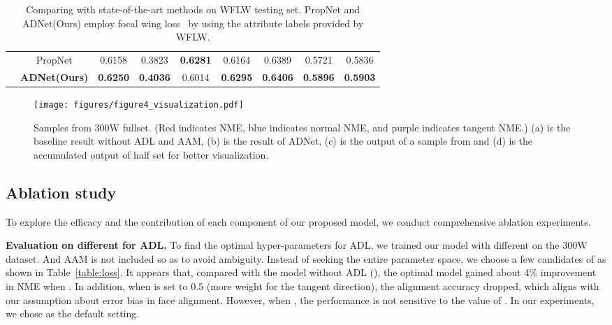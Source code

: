 \documentclass[10pt,twocolumn,letterpaper]{article}
\begin{document}
\begin{table*}
\begin{center}
\begin{tabular}{|l|c|c|c|c|c|c|c|c|}
\cline{2-9}
 & PropNet & 0.6158 & 0.3823 & \textbf{0.6281} & 0.6164 & 0.6389 & 0.5721 & 0.5836 \\
 & \textbf{ADNet(Ours)} & \textbf{0.6250} & \textbf{0.4036} & 0.6014 & \textbf{0.6295} & \textbf{0.6406} & \textbf{0.5896} & \textbf{0.5903} \\
\hline
\end{tabular}
\end{center}
\caption{Comparing with state-of-the-art methods on WFLW testing set. PropNet and ADNet(Ours) employ focal wing loss~\cite{huang2020propagationnet} by using the attribute labels provided by WFLW.}
\label{table:WFLW}
\end{table*}


\begin{figure}
\begin{center}
\texttt{[image: figures/figure4\_visualization.pdf]}
\end{center}
   \caption{Samples from 300W fullset. (\textcolor[rgb]{1, 0, 0}{Red} indicates NME, \textcolor[rgb]{0, 0.44, 0.75}{blue} indicates normal NME, and \textcolor[rgb]{0.44, 0.19, 0.63}{purple} indicates tangent NME.) (a) is the baseline result without ADL and AAM, (b) is the result of ADNet, (c) is the output of a sample from \textbf{} and (d) is the accumulated output of half \textbf{} set for better visualization.}
\label{figure:visualization}
\end{figure}

\subsection{Ablation study}
\label{subsection:ablation_study}
To explore the efficacy and the contribution of each component of our proposed model, we conduct comprehensive ablation experiments.

\vspace{5pt}
\noindent\textbf{Evaluation on different  for ADL.}
To find the optimal hyper-parameters for ADL, we trained our model with different  on the 300W dataset. And AAM is not included so as to avoid 
ambiguity.
Instead of seeking the entire parameter space, we choose a few candidates of  as shown in Table~\ref{table:loss}.
It appears that, compared with the model without ADL (), the optimal model gained about 4\% improvement in NME when .
In addition, when  is set to 0.5 (more weight for the tangent direction), the alignment accuracy dropped, which aligns with our assumption about error bias in face alignment.
However, when , the performance is not sensitive to the value of .
In our experiments, we chose  as the default setting.
\end{document}
